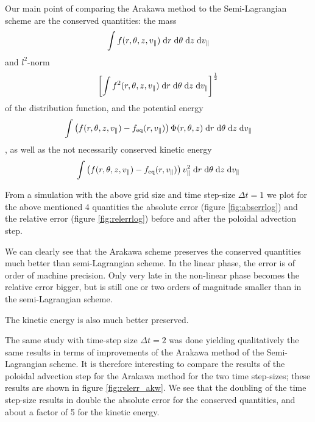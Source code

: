 Our main point of comparing the Arakawa method to the Semi-Lagrangian scheme are the conserved quantities: the mass
\begin{equation}
	\int f(r, \theta, z, v_\parallel) \;\text{d} r \;\text{d} \theta \;\text{d} z \;\text{d} v_\parallel
\end{equation}
and $l^2$-norm
\begin{equation}
	\left[\int f^2(r, \theta, z, v_\parallel) \;\text{d} r \;\text{d} \theta \;\text{d} z \;\text{d} v_\parallel\right]^\frac{1}{2}
\end{equation}
of the distribution function, and the potential energy
\begin{equation}
	\int \left(f(r, \theta, z, v_\parallel) - f_\text{eq}(r, v_\parallel)\right) \Phi(r, \theta, z) \;\text{d} r \;\text{d} \theta \;\text{d} z \;\text{d} v_\parallel
\end{equation}
, as well as the not necessarily conserved kinetic energy
\begin{equation}
	\int \left(f(r, \theta, z, v_\parallel) - f_\text{eq}(r, v_\parallel)\right) v^2_\parallel \;\text{d} r \;\text{d} \theta \;\text{d} z \;\text{d} v_\parallel
\end{equation}

From a simulation with the above grid size and time step-size $\Delta t = 1$ we plot for the above mentioned 4 quantities the absolute error (figure \ref{fig:abserrlog}) and the relative error (figure \ref{fig:relerrlog}) before and after the poloidal advection step.

We can clearly see that the Arakawa scheme preserves the conserved quantities much better than semi-Lagrangian scheme. In the linear phase, the error is of order of machine precision. Only very late in the non-linear phase becomes the relative error bigger, but is still one or two orders of magnitude smaller than in the semi-Lagrangian scheme.

The kinetic energy is also much better preserved.

The same study with time-step size $\Delta t = 2$ was done yielding qualitatively the same results in terms of improvements of the Arakawa method of the Semi-Lagrangian scheme. It is therefore interesting to compare the results of the poloidal advection step for the Arakawa method for the two time step-sizes; these results are shown in figure \ref{fig:relerr_akw}. We see that the doubling of the time step-size results in double the absolute error for the conserved quantities, and about a factor of 5 for the kinetic energy.


